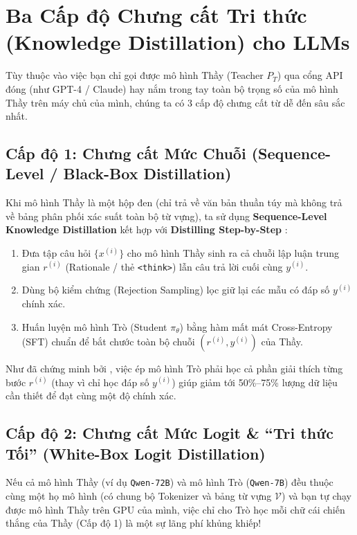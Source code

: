 \section{Ba Cấp độ Chưng cất Tri thức (Knowledge Distillation) cho LLMs}
\label{sec:three_distill_levels}

Tùy thuộc vào việc bạn chỉ gọi được mô hình Thầy (Teacher $P_T$) qua cổng API đóng (như GPT-4 / Claude) hay nắm trong tay toàn bộ trọng số của mô hình Thầy trên máy chủ của mình, chúng ta có 3 cấp độ chưng cất từ dễ đến sâu sắc nhất.

\subsection{Cấp độ 1: Chưng cất Mức Chuỗi (Sequence-Level / Black-Box Distillation)}

Khi mô hình Thầy là một hộp đen (chỉ trả về văn bản thuần túy mà không trả về bảng phân phối xác suất toàn bộ từ vựng), ta sử dụng \textbf{Sequence-Level Knowledge Distillation} \citep{kim2016sequence} kết hợp với \textbf{Distilling Step-by-Step} \citep{hsieh2023distilling}:
\begin{enumerate}
  \item Đưa tập câu hỏi $\{x^{(i)}\}$ cho mô hình Thầy sinh ra cả chuỗi lập luận trung gian $r^{(i)}$ (Rationale / thẻ \texttt{<think>}) lẫn câu trả lời cuối cùng $y^{(i)}$.
  \item Dùng bộ kiểm chứng (Rejection Sampling) lọc giữ lại các mẫu có đáp số $y^{(i)}$ chính xác.
  \item Huấn luyện mô hình Trò (Student $\pi_\theta$) bằng hàm mất mát Cross-Entropy (SFT) chuẩn để bắt chước toàn bộ chuỗi $(r^{(i)}, y^{(i)})$ của Thầy.
\end{enumerate}
Như đã chứng minh bởi \citet{hsieh2023distilling}, việc ép mô hình Trò phải học cả phần giải thích từng bước $r^{(i)}$ (thay vì chỉ học đáp số $y^{(i)}$) giúp giảm tới 50\%--75\% lượng dữ liệu cần thiết để đạt cùng một độ chính xác.

\subsection{Cấp độ 2: Chưng cất Mức Logit \& ``Tri thức Tối'' (White-Box Logit Distillation)}

Nếu cả mô hình Thầy (ví dụ \texttt{Qwen-72B}) và mô hình Trò (\texttt{Qwen-7B}) đều thuộc cùng một họ mô hình (có chung bộ Tokenizer và bảng từ vựng $\mathcal{V}$) và bạn tự chạy được mô hình Thầy trên GPU của mình, việc chỉ cho Trò học mỗi chữ cái chiến thắng của Thầy (Cấp độ 1) là một sự lãng phí khủng khiếp!

